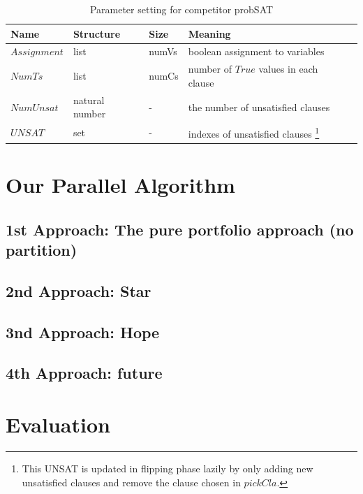 \documentclass[12pt,a4paper,twoside]{scrartcl}
\numberwithin{equation}{section}
\begin{document}
\begin{table}[h!]
\begin{center}
    \begin{tabular}{|l|l|l|l|p{1cm}|}
\hline 
 	Name &Structure & Size & Meaning\\ \hline
    $Assignment$&list & numVs & boolean assignment to variables\\ \hline
	$NumTs$&list & numCs& number of $True$ values in each clause \\ \hline
	$NumUnsat$& natural number & -&the number of unsatisfied clauses  \\ \hline
	$UNSAT$& set & - & indexes of unsatisfied clauses \footnote{This UNSAT is updated in flipping phase lazily by only adding new unsatisfied clauses and remove the clause chosen in $pickCla$.}\\ \hline

	
\end{tabular}
\caption[probSAT]{Parameter setting for competitor probSAT}
\end{center}
\end{table} 

\section{Our Parallel Algorithm}
\label{sec:parallel}
\label{sec:Our parallel Algorithm}
\subsection{1st Approach: The pure portfolio approach (no partition)}
\subsection{2nd Approach: Star}
\subsection{3nd Approach: Hope}
\subsection{4th Approach: future}

\clearpage
\section{Evaluation} 
\label{sec:eva}
\end{document}
